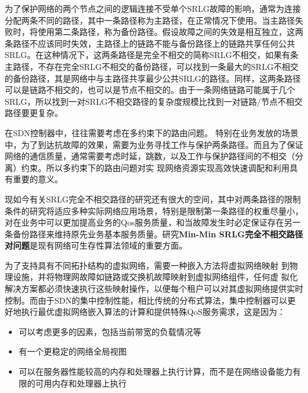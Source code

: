 为了保护网络的两个节点之间的逻辑连接不受单个SRLG故障的影响，通常为连接分配两条不同的路径，其中一条路径称为主路径，在正常情况下使用。当主路径失败时，将使用第二条路径，称为备份路径。假设故障之间的失效是相互独立，这两条路径不应该同时失效，主路径上的链路不能与备份路径上的链路共享任何公共SRLG。在这种情况下，这两条路径是完全不相交的简称SRLG不相交，如果有条主路径，不存在完全SRLG不相交的备份路径，可以找到一条最大的SRLG不相交的备份路径，其是网络中与主路径共享最少公共SRLG的路径\cite{rostami2012msdp}。同样，这两条路径可以是链路不相交的，也可以是节点不相交的。由于一条网络链路可能属于几个SRLG，所以找到一对SRLG不相交路径的复杂度规模比找到一对链路/节点不相交路径要更复杂。

在SDN控制器中，往往需要考虑在多约束下的路由问题\cite{akyildiz2014roadmap}。 特别在业务发放的场景中，为了到达抗故障的效果，需要为业务寻找工作与保护两条路径。而且为了保证网络的通信质量，通常需要考虑时延，跳数，以及工作与保护路径间的不相交（分离）约束。所以多约束下的路由问题对实 现网络资源实现高效快速调配和利用具有重要的意义。


现如今有关SRLG完全不相交路径的研究还有很大的空间，其中对两条路径的限制条件的研究将适应多种实际网络应用场景，特别是限制第一条路径的权重尽量小，对在业务中可以更加提高业务的Qos服务质量，和当故障发生时必定保证存在另一条备份路径来维持原先业务基本服务质量。研究\textbf{Min-Min SRLG完全不相交路径对问题}是现有网络可生存性算法领域的重要方面。





为了支持具有不同拓扑结构的虚拟网络，需要一种嵌入方法将虚拟网络映射 到物理设施，并将物理网故障如链路或交换机故障映射到虚拟网络组件，任何虚 拟化解决方案都必须快速执行这些映射操作，以便每个租户可以对其虚拟网络提供实时控制。而由于SDN的集中控制性能，相比传统的分布式算法，集中控制器可以更好地执行最优虚拟网络嵌入算法的计算和提供特殊QoS服务需求，这是因为：
\begin{itemize}
  \item 可以考虑更多的因素，包括当前带宽的负载情况等
  \item 有一个更稳定的网络全局视图
  \item 可以在服务器性能较高的内存和处理器上执行计算，而不是在网络设备能力有限的可用内存和处理器上执行
\end{itemize}

